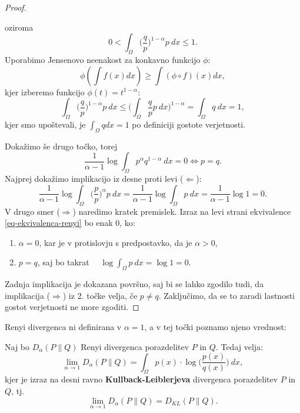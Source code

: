 \begin{proof}
\begin{itemize}
\begin{equation*}
		\end{equation*}
		oziroma
		\begin{equation*}
			0 <\int_\Omega \Big(\frac{q}{p}\Big)^{1-\alpha} p \  dx \leq 1.
		\end{equation*}
		Uporabimo Jensenovo neenakost za konkavno funkcijo $\phi$:
		\begin{equation*}
			\phi(\int f(x) dx) \geq \int (\phi \circ f) (x) dx,
		\end{equation*}
		kjer izberemo funkcijo $\phi(t) = t^{1-\alpha}$:
		\begin{equation*}
			\int_\Omega \Big(\frac{q}{p}\Big)^{1-\alpha} p \  dx \leq \Big(\int_\Omega \frac{q}{p} p \ dx\Big)^{1-\alpha} = \int_\Omega q \ dx = 1,
		\end{equation*}
		kjer smo upoštevali, je $\int_\Omega q dx = 1$ po definiciji gostote verjetnosti.
	\end{itemize}
	Dokažimo še drugo točko, torej
	\begin{equation}\label{eq-ekvivalenca-renyi}
		\frac{1}{\alpha - 1}\log \int_\Omega p^\alpha q^{1-\alpha} \  dx = 0 \Leftrightarrow p = q.
	\end{equation}
	Najprej dokažimo implikacijo iz desne proti levi ($\Leftarrow$):
	\begin{equation*}
		\frac{1}{\alpha - 1}\log\int_\Omega \Big(\frac{p}{p}\Big)^\alpha p \  dx = \frac{1}{\alpha - 1}\log\int_\Omega p \  dx = \frac{1}{\alpha - 1}\log 1 = 0.
	\end{equation*}
	V drugo smer ($\Rightarrow$) naredimo kratek premislek. Izraz na levi strani ekvivalence \eqref{eq-ekvivalenca-renyi} bo enak $0$, ko:
	\begin{enumerate}
		\item $\alpha = 0$, kar je v protislovju s predpostavko, da je $\alpha > 0$,
		\item $p = q$, saj bo takrat \ \  $\log\int_\Omega p \ dx = \log 1 = 0$.
	\end{enumerate}
	Zadnja implikacija je dokazana površno, saj bi se lahko zgodilo tudi, da implikacija ($\Rightarrow$) iz 2. točke velja, če $p \neq q$. Zaključimo, da se to zaradi lastnosti gostot verjetnosti ne more zgoditi.
\end{proof}

Renyi divergenca ni definirana v $\alpha = 1$, a v tej točki poznamo njeno vrednost:

\begin{izrek}\label{div_v_1}
	Naj bo $D_\alpha(P \| Q)$ Renyi divergenca porazdelitev $P$ in $Q$. Tedaj velja:
	\begin{equation}
		\lim_{\alpha \rightarrow 1} D_\alpha(P \| Q) = \int_\Omega p(x) \cdot \log\Big(\frac{p(x)}{q(x)}\Big) \  dx,
	\end{equation}
	kjer je izraz na desni ravno \textbf{Kullback-Leiblerjeva} divergenca porazdelitev $P$ in $Q$, tj.
	\begin{equation}
		\lim_{\alpha \rightarrow 1} D_\alpha(P \| Q) = D_{KL} (P \| Q).
	\end{equation}
\end{izrek}


